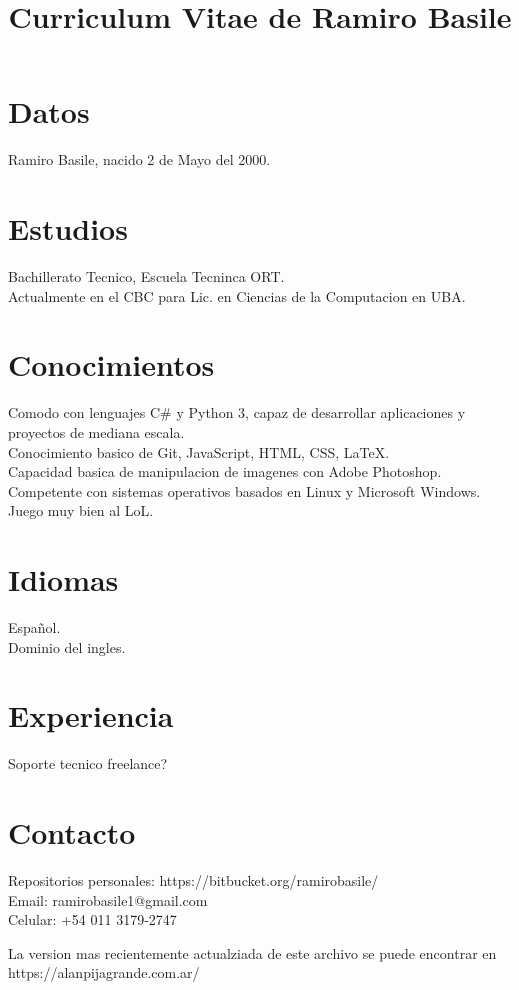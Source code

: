 \documentclass[11pt]{article}
\title{Curriculum Vitae de Ramiro Basile}
\begin{document}

\section*{Datos}
Ramiro Basile, nacido 2 de Mayo del 2000.

\section*{Estudios}
Bachillerato Tecnico, Escuela Tecninca ORT.\\
Actualmente en el CBC para Lic. en Ciencias de la Computacion en UBA.

\section*{Conocimientos}
Comodo con lenguajes C\# y Python 3, capaz de desarrollar aplicaciones y proyectos de mediana escala.\\
Conocimiento basico de Git, JavaScript, HTML, CSS, LaTeX.\\
Capacidad basica de manipulacion de imagenes con Adobe Photoshop.\\
Competente con sistemas operativos basados en Linux y Microsoft Windows.\\
Juego muy bien al LoL.

\section*{Idiomas}
Español.\\
Dominio del ingles.

\section*{Experiencia}
Soporte tecnico freelance?

\section*{Contacto}
Repositorios personales: https://bitbucket.org/ramirobasile/\\
Email: ramirobasile1@gmail.com\\
Celular: +54 011 3179-2747

\mbox{}
\vfill

\begin{center}

La version mas recientemente actualziada de este archivo se puede encontrar en  https://alanpijagrande.com.ar/

\end{center}
\end{document}
